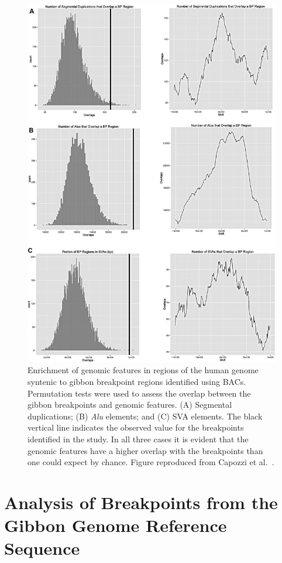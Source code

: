 \begin{figure}
\centering
\includegraphics[width=.85\textwidth]{figures/gibbon_bac_permutations.jpg}
\caption{Enrichment of genomic features in regions of the human genome syntenic to gibbon breakpoint regions identified using BACs. Permutation tests were used to assess the overlap between the gibbon breakpoints and genomic features. (A) Segmental duplications; (B) \emph{Alu} elements; and (C) SVA elements. The black vertical line indicates the observed value for the breakpoints identified in the study. In all three cases it is evident that the genomic features have a higher overlap with the breakpoints than one could expect by chance. Figure reproduced from Capozzi et al.~\cite{Capozzi:2012bb}.}
\label{gibbon_bac_permutations}
\end{figure}

\section{Analysis of Breakpoints from the Gibbon Genome Reference Sequence}

